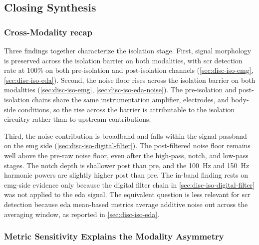 \subsection{Closing Synthesis}
\label{sec:disc-iso-synthesis}

\subsubsection{Cross-Modality recap}
\label{sec:disc-iso-synthesis-recap}

Three findings together characterize the isolation stage. First, signal morphology is preserved across the isolation barrier on both modalities, with \gls{scr} detection rate at 100\% on both pre-isolation and post-isolation channels (\autoref{sec:disc-iso-emg}, \autoref{sec:disc-iso-eda}). Second, the noise floor rises across the isolation barrier on both modalities (\autoref{sec:disc-iso-emg}, \autoref{sec:disc-iso-eda-noise}). The pre-isolation and post-isolation chains share the same instrumentation amplifier, electrodes, and body-side conditions, so the rise across the barrier is attributable to the isolation circuitry rather than to upstream contributions.

Third, the noise contribution is broadband and falls within the signal passband on the \gls{emg} side (\autoref{sec:disc-iso-digital-filter}). The post-filtered noise floor remains well above the pre-raw noise floor, even after the high-pass, notch, and low-pass stages. The notch depth is shallower post than pre, and the \SI{100}{\hertz} and \SI{150}{\hertz} harmonic powers are slightly higher post than pre. The in-band finding rests on \gls{emg}-side evidence only because the digital filter chain in \autoref{sec:disc-iso-digital-filter} was not applied to the \gls{eda} signal. The equivalent question is less relevant for \gls{scr} detection because \gls{eda} mean-based metrics average additive noise out across the averaging window, as reported in \autoref{sec:disc-iso-eda}.

\subsubsection{Metric Sensitivity Explains the Modality Asymmetry}
\label{sec:disc-iso-synthesis-asymmetry}

